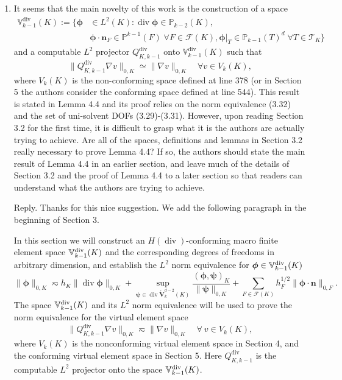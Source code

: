 \documentclass[10pt]{amsart}
\theoremstyle{definition}
\theoremstyle{remark}
\renewcommand{\div}{\operatorname{div}}
\begin{document}
\begin{enumerate}[1.]
\item \textsf{It seems that the main novelty of this work is the construction of a space
\begin{align*}
\mathbb V_{k-1}^{\div}(K):=\{\boldsymbol{\phi}&\in L^2(K): \div\boldsymbol{\phi}\in\mathbb P_{k-2}(K), \\
& \boldsymbol{\phi}\cdot\boldsymbol{n}_F\in\mathbb P^{k-1}(F)\;\forall F\in\mathcal F(K), \boldsymbol{\phi}|_T\in\mathbb P_{k-1}(T)^d\;\forall T\in\mathcal T_K
\}
\end{align*}
and a computable $L^2$ projector $Q_{K,k-1}^{\div}$ onto $\mathbb V_{k-1}^{\div}(K)$ such that
$$
\|Q_{K,k-1}^{\div}\nabla v\|_{0,K}\simeq \|\nabla v\|_{0,K} \quad\forall v\in V_k(K),
$$
where $V_k(K)$ is the non-conforming space defined at line 378 (or in Section 5 the authors consider the conforming space defined at line 544). This result is stated in Lemma 4.4 and its proof relies on the norm equivalence (3.32) and the set of uni-solvent DOFs (3.29)-(3.31). However, upon reading Section 3.2 for the first time, it is difficult to grasp what it is the authors are actually trying to achieve. Are all of the spaces, definitions and lemmas in Section 3.2 really necessary to prove Lemma 4.4? If so, the authors should state the main result of Lemma 4.4 in an earlier section, and leave much of the details of Section 3.2 and the proof of Lemma 4.4 to a later section so that readers can understand what the authors are trying to achieve.}

\smallskip \noindent \textcolor[rgb]{1.00,0.00,0.00}{Reply.}
Thanks for this nice suggestion. We add the following paragraph in the beginning of Section 3.

In this section we will construct an $H(\div)$-conforming macro finite element space $\mathbb{V}_{k-1}^{\rm div}(K)$ and the corresponding degrees of freedoms in arbitrary dimension, and establish the $L^2$ norm equivalence for $\boldsymbol{\phi}\in\mathbb{V}_{k-1}^{\rm div}(K)$
\begin{equation*}%
\|\boldsymbol{\phi}\|_{0,K}\eqsim h_K\|\div\boldsymbol{\phi}\|_{0,K} + \sup_{\boldsymbol{\psi}\in\div\mathring{\boldsymbol{V}}_{k}^{d-2}(K)}\frac{(\boldsymbol{\phi}, \boldsymbol{\psi})_K}{\|\boldsymbol{\psi}\|_{0,K}} +\sum_{F\in\mathcal F(K)}h_F^{1/2}\|\boldsymbol{\phi}\cdot\boldsymbol{n}\|_{0,F}.
\end{equation*}
The space $\mathbb{V}_{k-1}^{\rm div}(K)$ and its $L^2$ norm equivalence will be used to prove
the norm equivalence for the virtual element space
\begin{equation*}%
\|Q_{K,k-1}^{\div}\nabla v\|_{0,K}\eqsim \|\nabla v\|_{0,K} \quad \forall~v\in V_k(K),
\end{equation*}
where $V_k(K)$ is the nonconforming virtual element space in Section 4, and the conforming virtual element space in Section 5. Here $Q_{K,k-1}^{\div}$ is the computable $L^2$ projector onto the space $\mathbb{V}_{k-1}^{\rm div}(K)$.



\end{enumerate}
\end{document}
